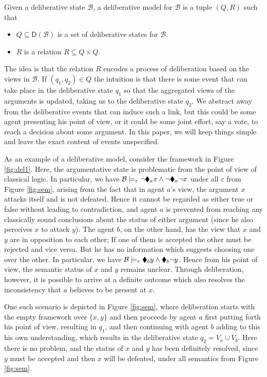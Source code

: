 \documentclass[greybox]{svmult}
\newcommand{\dstate}[1]{\mathsf D({#1}) }
\newcommand{\views}{\mathcal B}
\newcommand{\sem}{\varepsilon}
\begin{document}
\begin{definition}\label{def:dk}
Given a deliberative state $\views$, a deliberative model for $\views$ is a tuple $(Q,R)$ such that
\begin{itemize}
\item $Q \subseteq \dstate \views$ is a set of deliberative states for $\views$.
\item $R$ is a relation $R \subseteq Q \times Q$.
\end{itemize}
\end{definition}

The idea is that the relation $R$ encodes a process of deliberation based on the views in $\views$. If $(q_1,q_2) \in Q$ the intuition is that there is some event that can take place in the deliberative state $q_1$ so that the aggregated views of the arguments is updated, taking us to the deliberative state $q_2$. We abstract away from the deliberative events that can induce such a link, but this could be some agent presenting his point of view, or it could be some joint effort, say a vote, to reach a decision about some argument. In this paper, we will keep things simple and leave the exact content of events unspecified.

As an example of a deliberative model, consider the framework in Figure \ref{fig:del1}. Here, the argumentative state is problematic from the point of view of classical logic. In particular, we have $\views \models_\sem \neg \cdia_a x \land \neg \cdia_a \neg x$ under all $\sem$ from Figure \ref{fig:sem}, arising from the fact that in agent $a$'s view, the argument $x$ attacks itself and is not defeated. Hence it cannot be regarded as either true or false without leading to contradiction, and agent $a$ is prevented from reaching any classically sound conclusions about the status of either argument (since he also perceives $x$ to attack $y$). The agent $b$, on the other hand, has the view that $x$ and $y$ are in opposition to each other; If one of them is accepted the other must be rejected and vice versa. But he has no information which suggests choosing one over the other. In particular, we have $\views \models_\sem \cdia_b y \land \cdia_b \neg y$. Hence from his point of view, the semantic status of $x$ and $y$ remains unclear. Through deliberation, however, it is possible to arrive at a definite outcome which also resolves the inconsistency that $a$ believes to be present at $x$. 

One such scenario is depicted in Figure \ref{fig:sem}, where deliberation starts with the empty framework over $\{x,y\}$ and then proceeds by agent $a$ first putting forth his point of view, resulting in $q_1$, and then continuing with agent $b$ adding to this his own understanding, which results in the deliberative state $q_2 = V_a \cup V_b$. Here there is no problem, and the status of $x$ and $y$ has been definitely resolved, since $y$ must be accepted and then $x$ will be defeated, under all semantics from Figure \ref{fig:sem}.
\end{document}

